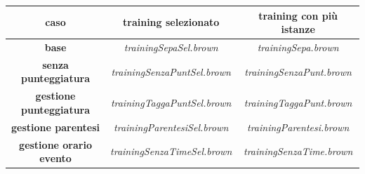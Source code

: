 \documentclass[a4paper]{report}
\begin{document}
\begin{tabular}{|c|c|c|}
\hline
caso & training selezionato & training con più istanze\\
\hline
\textbf{base} & \textit{trainingSepaSel.brown} & \textit{trainingSepa.brown}\\
\hline
\textbf{senza punteggiatura} & \textit{trainingSenzaPuntSel.brown} & \textit{trainingSenzaPunt.brown}\\
\hline
\textbf{gestione punteggiatura} & \textit{trainingTaggaPuntSel.brown} & \textit{trainingTaggaPunt.brown}\\
\hline
\textbf{gestione parentesi} & \textit{trainingParentesiSel.brown} & \textit{trainingParentesi.brown}\\
\hline
\textbf{gestione orario evento} & \textit{trainingSenzaTimeSel.brown} & \textit{trainingSenzaTime.brown}\\
\hline
\end{tabular}
\end{document}
